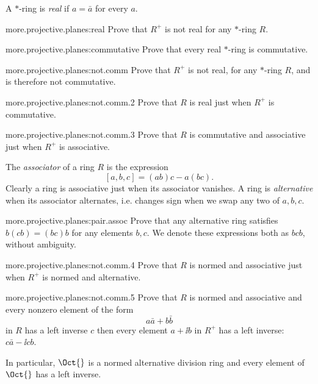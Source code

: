 A \(*\)-ring is \emph{real} if \(a=\bar{a}\) for every \(a\).
\begin{problem}{more.projective.planes:real}
Prove that \(R^+\) is not real for any \(*\)-ring \(R\).
\end{problem}
\begin{problem}{more.projective.planes:commutative}
Prove that every real \(*\)-ring is commutative.
\end{problem}
\begin{problem}{more.projective.planes:not.comm}
Prove that \(R^+\) is not real, for any \(*\)-ring \(R\), and is therefore not commutative.
\end{problem}
\begin{problem}{more.projective.planes:not.comm.2}
Prove that \(R\) is real just when \(R^+\) is commutative.
\end{problem}
\begin{problem}{more.projective.planes:not.comm.3}
Prove that \(R\) is commutative and associative just when \(R^+\) is associative.
\end{problem}
The \emph{associator} of a ring \(R\) is the expression
\[
\left[a,b,c\right]=(ab)c-a(bc).
\]
Clearly a ring is associative just when its associator vanishes.
A ring is \emph{alternative} when its associator alternates, i.e. changes sign when we swap any two of \(a,b,c\).
\begin{problem}{more.projective.planes:pair.assoc}
Prove that any alternative ring satisfies \(b(cb)=(bc)b\) for any elements \(b,c\).
We denote these expressions both as \(bcb\), without ambiguity.
\end{problem}
\begin{problem}{more.projective.planes:not.comm.4}
Prove that \(R\) is normed and associative just when \(R^+\) is normed and alternative.
\end{problem}
\begin{problem}{more.projective.planes:not.comm.5}
Prove that \(R\) is normed and associative and every nonzero element of the form
\[
a\bar{a}+b\bar{b}
\]
in \(R\) has a left inverse \(c\) then every element \(a+\ii b\) in \(R^+\) has a left inverse: \(c\bar{a}- \ii cb\).
\end{problem}
In particular, \(\Oct{}\) is a normed alternative division ring and every element of \(\Oct{}\) has a left inverse.


